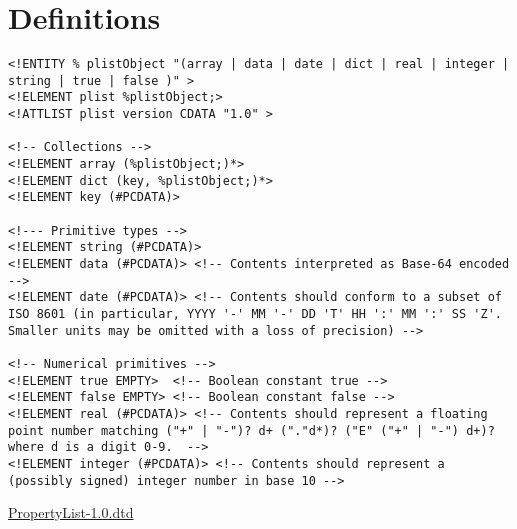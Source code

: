 









\chapter{Definitions}

\begin{table}[htdp]
\begin{center}
\begin{lstlisting}[mathescape]
<!ENTITY % plistObject "(array | data | date | dict | real | integer | string | true | false )" >
<!ELEMENT plist %plistObject;>
<!ATTLIST plist version CDATA "1.0" >

<!-- Collections -->
<!ELEMENT array (%plistObject;)*>
<!ELEMENT dict (key, %plistObject;)*>
<!ELEMENT key (#PCDATA)>

<!--- Primitive types -->
<!ELEMENT string (#PCDATA)>
<!ELEMENT data (#PCDATA)> <!-- Contents interpreted as Base-64 encoded -->
<!ELEMENT date (#PCDATA)> <!-- Contents should conform to a subset of ISO 8601 (in particular, YYYY '-' MM '-' DD 'T' HH ':' MM ':' SS 'Z'.  Smaller units may be omitted with a loss of precision) -->

<!-- Numerical primitives -->
<!ELEMENT true EMPTY>  <!-- Boolean constant true -->
<!ELEMENT false EMPTY> <!-- Boolean constant false -->
<!ELEMENT real (#PCDATA)> <!-- Contents should represent a floating point number matching ("+" | "-")? d+ ("."d*)? ("E" ("+" | "-") d+)? where d is a digit 0-9.  -->
<!ELEMENT integer (#PCDATA)> <!-- Contents should represent a (possibly signed) integer number in base 10 -->
\end{lstlisting}
\caption{\href{http://www.apple.com/DTDs/PropertyList-1.0.dtd}{PropertyList-1.0.dtd}}
\label{tab:PLISTDTD}
\end{center}

\end{table}%

